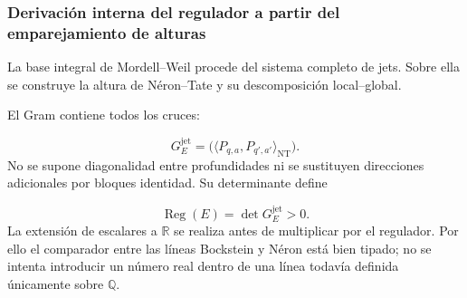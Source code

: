 \subsubsection{Derivación interna del regulador a partir del emparejamiento de alturas}
La base integral de Mordell–Weil procede del sistema completo de jets. Sobre ella se construye la altura de Néron–Tate y su descomposición local–global.\par
El Gram contiene todos los cruces:\par
\[
G_E^{\mathrm{jet}}
=
\bigl(
\langle P_{q,a},P_{q',a'}\rangle_{\mathrm{NT}}
\bigr).
\]
No se supone diagonalidad entre profundidades ni se sustituyen direcciones adicionales por bloques identidad. Su determinante define\par
\[
\operatorname{Reg}(E)
=
\det G_E^{\mathrm{jet}}
>0.
\]
La extensión de escalares a \(\mathbb R\) se realiza antes de multiplicar por el regulador. Por ello el comparador entre las líneas Bockstein y Néron está bien tipado; no se intenta introducir un número real dentro de una línea todavía definida únicamente sobre \(\mathbb Q\).\par
{}
